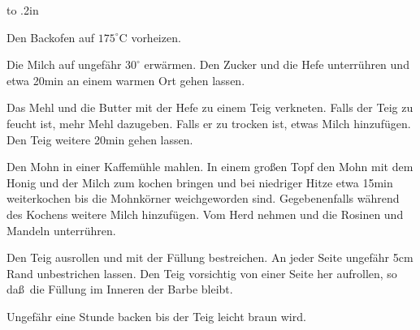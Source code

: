 \documentclass[10pt,twocolumn,a4paper]{article}
\begin{document}
\leavevmode\vbox to .2in{\vss}

Den Backofen auf $175^{\circ}$C vorheizen.

Die Milch auf ungef\"ahr $30^{\circ}$ erw\"armen. Den Zucker und die
Hefe unterr\"uhren und etwa 20min an einem warmen Ort gehen lassen.

Das Mehl und die Butter mit der Hefe zu einem Teig verkneten. Falls
der Teig zu feucht ist, mehr Mehl dazugeben. Falls er zu trocken ist,
etwas Milch hinzuf\"ugen. Den Teig weitere 20min gehen lassen.

Den Mohn in einer Kaffem\"uhle mahlen. In einem gro\ss en Topf den
Mohn mit dem Honig und der Milch zum kochen bringen und bei niedriger
Hitze etwa 15min weiterkochen bis die Mohnk\"orner weichgeworden
sind. Gegebenenfalls w\"ahrend des Kochens weitere Milch
hinzuf\"ugen. Vom Herd nehmen und die Rosinen und Mandeln
unterr\"uhren.

Den Teig ausrollen und mit der F\"ullung bestreichen. An jeder Seite
ungef\"ahr 5cm Rand unbestrichen lassen. Den Teig vorsichtig von einer 
Seite her aufrollen, so da\ss\ die F\"ullung im Inneren der Barbe
bleibt.

Ungef\"ahr eine Stunde backen bis der Teig leicht braun wird.
\end{document}
